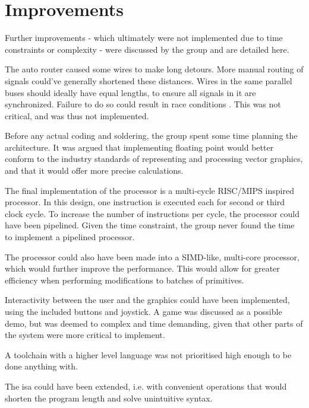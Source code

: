 \section{Improvements}
Further improvements - which ultimately were not implemented due to time constraints or complexity - were discussed by the group and are detailed here.

The auto router caused some wires to make long detours.
More manual routing of signals could've generally shortened these distances.
Wires in the same parallel buses should ideally have equal lengths, to ensure all signals in it are synchronized. 
Failure to do so could result in race conditions \cite{race-conditions}. 
This was not critical, and was thus not implemented.

Before any actual coding and soldering, the group spent some time planning the architecture.
It was argued that implementing floating point would better conform to the industry standards of representing and processing vector graphics, and that it would offer more precise calculations.

The final implementation of the processor is a multi-cycle RISC/MIPS inspired processor.
In this design, one instruction is executed each for second or third clock cycle.
To increase the number of instructions per cycle, the processor could have been pipelined.
Given the time constraint, the group never found the time to implement a pipelined processor.

The processor could also have been made into a SIMD-like, multi-core processor, which would further improve the performance.
This would allow for greater efficiency when performing modifications to batches of primitives.

Interactivity between the user and the graphics could have been implemented, using the included buttons and joystick. A game was discussed as a possible demo, but was deemed to complex and time demanding, given that other parts of the system were more critical to implement.

A toolchain with a higher level language was not prioritised high enough to be done anything with.

The \gls{isa} could have been extended, i.e. with convenient operations that would shorten the program length and solve unintuitive syntax.
